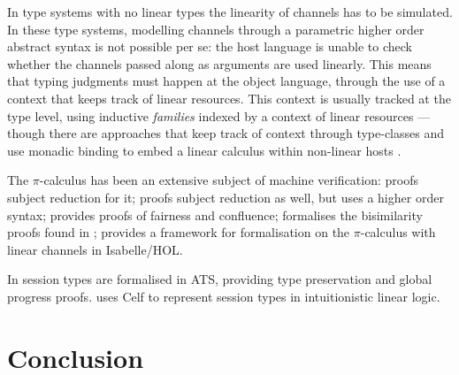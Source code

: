 \documentclass{mproj}
\newcommand{\picalc}{$\pi$-calculus}
\begin{document}
In type systems with no linear types the linearity of channels has to be simulated. In these type systems, modelling channels through a parametric higher order abstract syntax \cite{Chlipala2008} is not possible per se: the host language is unable to check whether the channels passed along as arguments are used linearly. This means that typing judgments must happen at the object language, through the use of a context that keeps track of linear resources.  This context is usually tracked at the type level, using inductive \emph{families} \cite{Dybjer1994} indexed by a context of linear resources \cite{Power2000} --- though there are approaches that keep track of context through type-classes and use monadic binding to embed a linear calculus within non-linear hosts \cite{Paykin2017}.

The \picalc{} has been an extensive subject of machine verification: \cite{Henry-Gerard1999} proofs subject reduction for it; \cite{Despeyroux2000} proofs subject reduction as well, but uses a higher order syntax; \cite{Affeldt2008} provides proofs of fairness and confluence; \cite{Honsell2001} formalises the bisimilarity proofs found in \cite{Walker1989}; \cite{Gay2001} provides a framework for formalisation on the \picalc{} with linear channels in Isabelle/HOL.

In \cite{Xi2016} session types are formalised in ATS, providing type preservation and global progress proofs. \cite{Bock2016} uses Celf to represent session types in intuitionistic linear logic.
\chapter{Conclusion}\label{conclusion}



\end{document}
